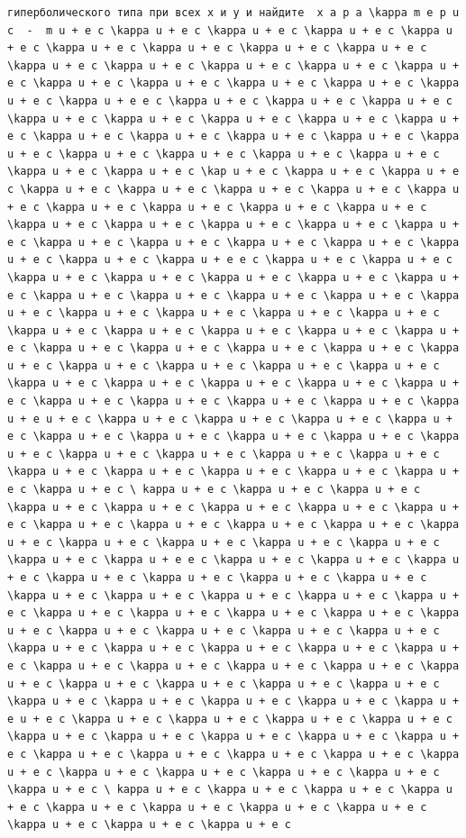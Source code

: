 \documentclass[
  ukrainian,
]{article}
\begin{document}
\begin{verbatim}
гиперболического типа при всех x и y и найдите  x a p a \kappa m e p u c  -  m u + e c \kappa u + e c \kappa u + e c \kappa u + e c \kappa u + e c \kappa u + e c \kappa u + e c \kappa u + e c \kappa u + e c \kappa u + e c \kappa u + e c \kappa u + e c \kappa u + e c \kappa u + e c \kappa u + e c \kappa u + e c \kappa u + e c \kappa u + e c \kappa u + e c \kappa u + e e c \kappa u + e c \kappa u + e c \kappa u + e c \kappa u + e c \kappa u + e c \kappa u + e c \kappa u + e c \kappa u + e c \kappa u + e c \kappa u + e c \kappa u + e c \kappa u + e c \kappa u + e c \kappa u + e c \kappa u + e c \kappa u + e c \kappa u + e c \kappa u + e c \kappa u + e c \kap u + e c \kappa u + e c \kappa u + e c \kappa u + e c \kappa u + e c \kappa u + e c \kappa u + e c \kappa u + e c \kappa u + e c \kappa u + e c \kappa u + e c \kappa u + e c \kappa u + e c \kappa u + e c \kappa u + e c \kappa u + e c \kappa u + e c \kappa u + e c \kappa u + e c \kappa u + e c \kappa u + e c \kappa u + e c \kappa u + e c \kappa u + e e c \kappa u + e c \kappa u + e c \kappa u + e c \kappa u + e c \kappa u + e c \kappa u + e c \kappa u + e c \kappa u + e c \kappa u + e c \kappa u + e c \kappa u + e c \kappa u + e c \kappa u + e c \kappa u + e c \kappa u + e c \kappa u + e c \kappa u + e c \kappa u + e c \kappa u + e c \kappa u + e c \kappa u + e c \kappa u + e c \kappa u + e c \kappa u + e c \kappa u + e c \kappa u + e c \kappa u + e c \kappa u + e c \kappa u + e c \kappa u + e c \kappa u + e c \kappa u + e c \kappa u + e c \kappa u + e c \kappa u + e c \kappa u + e c \kappa u + e c \kappa u + e c \kappa u + e c \kappa u + e u + e c \kappa u + e c \kappa u + e c \kappa u + e c \kappa u + e c \kappa u + e c \kappa u + e c \kappa u + e c \kappa u + e c \kappa u + e c \kappa u + e c \kappa u + e c \kappa u + e c \kappa u + e c \kappa u + e c \kappa u + e c \kappa u + e c \kappa u + e c \kappa u + e c \kappa u + e c \ kappa u + e c \kappa u + e c \kappa u + e c \kappa u + e c \kappa u + e c \kappa u + e c \kappa u + e c \kappa u + e c \kappa u + e c \kappa u + e c \kappa u + e c \kappa u + e c \kappa u + e c \kappa u + e c \kappa u + e c \kappa u + e c \kappa u + e c \kappa u + e c \kappa u + e e c \kappa u + e c \kappa u + e c \kappa u + e c \kappa u + e c \kappa u + e c \kappa u + e c \kappa u + e c \kappa u + e c \kappa u + e c \kappa u + e c \kappa u + e c \kappa u + e c \kappa u + e c \kappa u + e c \kappa u + e c \kappa u + e c \kappa u + e c \kappa u + e c \kappa u + e c \kappa u + e c \kappa u + e c \kappa u + e c \kappa u + e c \kappa u + e c \kappa u + e c \kappa u + e c \kappa u + e c \kappa u + e c \kappa u + e c \kappa u + e c \kappa u + e c \kappa u + e c \kappa u + e c \kappa u + e c \kappa u + e c \kappa u + e c \kappa u + e c \kappa u + e c \kappa u + e c \kappa u + e u + e c \kappa u + e c \kappa u + e c \kappa u + e c \kappa u + e c \kappa u + e c \kappa u + e c \kappa u + e c \kappa u + e c \kappa u + e c \kappa u + e c \kappa u + e c \kappa u + e c \kappa u + e c \kappa u + e c \kappa u + e c \kappa u + e c \kappa u + e c \kappa u + e c \kappa u + e c \ kappa u + e c \kappa u + e c \kappa u + e c \kappa u + e c \kappa u + e c \kappa u + e c \kappa u + e c \kappa u + e c \kappa u + e c \kappa u + e c \kappa u + e c 
\end{verbatim}
\end{document}
